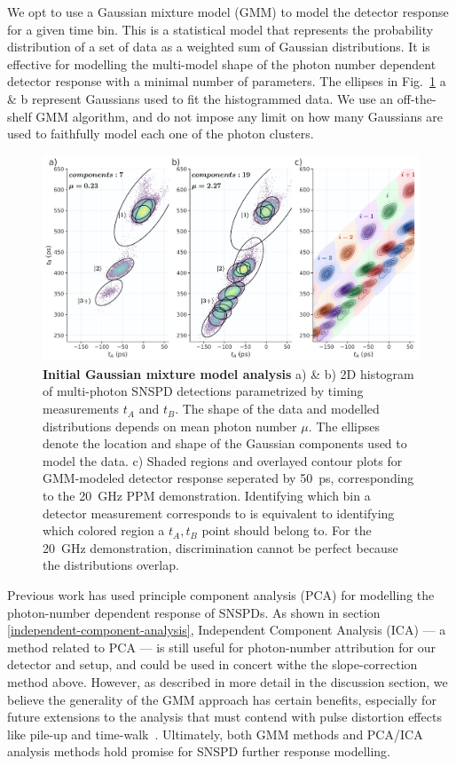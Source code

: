 \documentclass[11pt]{caltech_thesis} %
\begin{document}
We opt to use a Gaussian mixture model (GMM) to model the detector response for a given time bin. This is a statistical model that represents the probability distribution of a set of data as a weighted sum of Gaussian distributions. It is effective for modelling the multi-model shape of the photon number dependent detector response with a minimal number of parameters. The ellipses in Fig.~\ref{fig:gmm_model} a \& b represent Gaussians used to fit the histogrammed data. We use an off-the-shelf GMM algorithm, and do not impose any limit on how many Gaussians are used to faithfully model each one of the photon clusters.

\hypertarget{fig:gmm_model}{%
\begin{figure}
\centering
\includegraphics[width=1\textwidth,height=\textheight]{./chapter_04/figs/gmm_intro_analysis_t_light.pdf}
\caption[{Initial Gaussian mixture model analysis}]{\textbf{Initial Gaussian mixture model analysis} a) \& b) 2D histogram of multi-photon SNSPD detections parametrized by timing measurements $t_A$ and $t_B$. The shape of the data and modelled distributions depends on mean photon number $\mu$. The ellipses denote the location and shape of the Gaussian components used to model the data. c) Shaded regions and overlayed contour plots for GMM-modeled detector response seperated by 50~ps, corresponding to the 20~GHz PPM demonstration. Identifying which bin a detector measurement corresponds to is equivalent to identifying which colored region a $t_A, t_B$ point should belong to. For the 20~GHz demonstration, discrimination cannot be perfect because the distributions overlap.}
\label{fig:gmm_model}
\end{figure}
}

Previous work has used principle component analysis (PCA) for modelling the photon-number dependent response of SNSPDs. As shown in section \ref{independent-component-analysis}, Independent Component Analysis (ICA) --- a method related to PCA --- is still useful for photon-number attribution for our detector and setup, and could be used in concert withe the slope-correction method above. However, as described in more detail in the discussion section, we believe the generality of the GMM approach has certain benefits, especially for future extensions to the analysis that must contend with pulse distortion effects like pile-up and time-walk~\autocite{Mueller2023}. Ultimately, both GMM methods and PCA/ICA analysis methods hold promise for SNSPD further response modelling.
\end{document}
